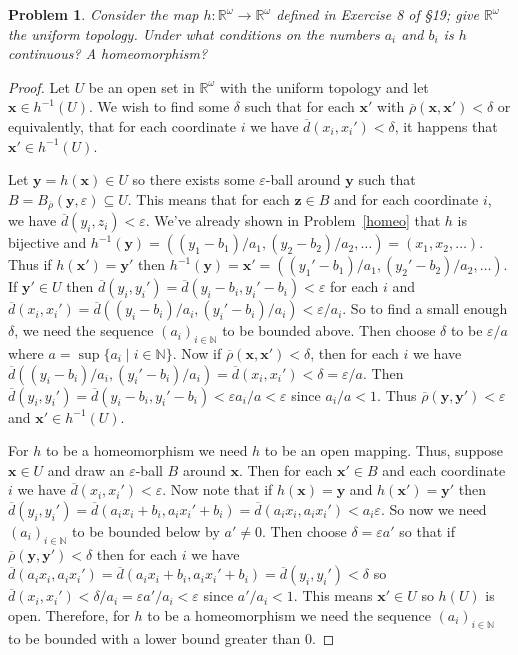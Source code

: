\documentclass{article}
\newtheorem{problem}{Problem}
\begin{document}
\begin{problem}
Consider the map $h : \mathbb{R}^{\omega} \to \mathbb{R}^{\omega}$ defined in Exercise 8 of \S 19; give $\mathbb{R}^{\omega}$ the uniform topology. Under what conditions on the numbers $a_i$ and $b_i$ is $h$ continuous? A homeomorphism?
\end{problem}
\begin{proof}
Let $U$ be an open set in $\mathbb{R}^{\omega}$ with the uniform topology and let $\mathbf{x} \in h^{-1}(U)$. We wish to find some $\delta$ such that for each $\mathbf{x'}$ with $\overline{\rho}(\mathbf{x},\mathbf{x'}) < \delta$ or equivalently, that for each coordinate $i$ we have $\overline{d}(x_i,x_i') < \delta$, it happens that $\mathbf{x'} \in h^{-1}(U)$.

Let $\mathbf{y} = h(\mathbf{x}) \in U$ so there exists some $\varepsilon$-ball around $\mathbf{y}$ such that $B = B_{\overline{\rho}}(\mathbf{y},\varepsilon) \subseteq U$. This means that for each $\mathbf{z} \in B$ and for each coordinate $i$, we have $\overline{d}(y_i, z_i) < \varepsilon$. We've already shown in Problem~\ref{homeo} that $h$ is bijective and $h^{-1}(\mathbf{y}) = ((y_1-b_1)/a_1, (y_2-b_2)/a_2, \dots ) = (x_1, x_2, \dots )$. Thus if $h(\mathbf{x'}) = \mathbf{y'}$ then $h^{-1}(\mathbf{y}) = \mathbf{x'} = ((y_1'-b_1)/a_1, (y_2'-b_2)/a_2, \dots )$. If $\mathbf{y'} \in U$ then $\overline{d}(y_i,y_i') = \overline{d}(y_i-b_i, y_i'-b_i) < \varepsilon$ for each $i$ and $\overline{d}(x_i,x_i') = \overline{d}((y_i-b_i)/a_i,(y_i'-b_i)/a_i) < \varepsilon/a_i$. So to find a small enough $\delta$, we need the sequence $(a_i)_{i \in \mathbb{N}}$ to be bounded above. Then choose $\delta$ to be $\varepsilon/a$ where $a = \sup\{a_i \mid i \in \mathbb{N}\}$. Now if $\overline{\rho}(\mathbf{x},\mathbf{x'}) < \delta$, then for each $i$ we have $\overline{d}((y_i-b_i)/a_i,(y_i'-b_i)/a_i) = \overline{d}(x_i,x_i') < \delta = \varepsilon/a$. Then $\overline{d}(y_i,y_i') = \overline{d}(y_i-b_i,y_i'-b_i) < \varepsilon a_i/a < \varepsilon$ since $a_i/a < 1$. Thus $\overline{\rho}(\mathbf{y},\mathbf{y'}) < \varepsilon$ and $\mathbf{x'} \in h^{-1}(U)$.

For $h$ to be a homeomorphism we need $h$ to be an open mapping. Thus, suppose $\mathbf{x} \in U$ and draw an $\varepsilon$-ball $B$ around $\mathbf{x}$. Then for each $\mathbf{x'} \in B$ and each coordinate $i$ we have $\overline{d}(x_i,x_i') < \varepsilon$. Now note that if $h(\mathbf{x}) = \mathbf{y}$ and $h(\mathbf{x'}) = \mathbf{y'}$ then $\overline{d}(y_i,y_i') = \overline{d}(a_ix_i+b_i,a_ix_i'+b_i) = \overline{d}(a_ix_i, a_ix_i') < a_i \varepsilon$. So now we need $(a_i)_{i \in \mathbb{N}}$ to be bounded below by $a' \neq 0$. Then choose $\delta = \varepsilon a'$ so that if $\overline{\rho}(\mathbf{y},\mathbf{y'}) < \delta$ then for each $i$ we have $\overline{d}(a_ix_i,a_ix_i') = \overline{d}(a_ix_i+b_i,a_ix_i'+b_i) = \overline{d}(y_i,y_i') < \delta$ so $\overline{d}(x_i,x_i') < \delta/a_i = \varepsilon a'/a_i < \varepsilon$ since $a'/a_i < 1$. This means $\mathbf{x'} \in U$ so $h(U)$ is open. Therefore, for $h$ to be a homeomorphism we need the sequence $(a_i)_{i \in \mathbb{N}}$ to be bounded with a lower bound greater than $0$.
\end{proof}
\end{document}
